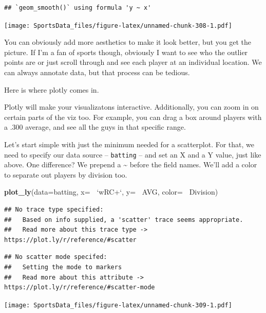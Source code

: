 \documentclass[
]{book}
\newenvironment{Shaded}{\begin{snugshade}}{\end{snugshade}}
\newcommand{\DataTypeTok}[1]{\textcolor[rgb]{0.13,0.29,0.53}{#1}}
\newcommand{\KeywordTok}[1]{\textcolor[rgb]{0.13,0.29,0.53}{\textbf{#1}}}
\newcommand{\NormalTok}[1]{#1}
\newcommand{\OperatorTok}[1]{\textcolor[rgb]{0.81,0.36,0.00}{\textbf{#1}}}
\newcommand{\StringTok}[1]{\textcolor[rgb]{0.31,0.60,0.02}{#1}}
\begin{document}
\begin{verbatim}
## `geom_smooth()` using formula 'y ~ x'
\end{verbatim}

\texttt{[image: SportsData\_files/figure-latex/unnamed-chunk-308-1.pdf]}

You can obviously add more aesthetics to make it look better, but you get the picture. If I'm a fan of sports though, obviously I want to see who the outlier points are or just scroll through and see each player at an individual location. We can always annotate data, but that process can be tedious.

Here is where plotly comes in.

Plotly will make your visualizatons interactive. Additionally, you can zoom in on certain parts of the viz too. For example, you can drag a box around players with a .300 average, and see all the guys in that specific range.

Let's start simple with just the minimum needed for a scatterplot. For that, we need to specify our data source -- \texttt{batting} -- and set an X and a Y value, just like above. One difference? We prepend a \textasciitilde{} before the field names. We'll add a color to separate out players by division too.

\begin{Shaded}
\begin{Highlighting}[]
\KeywordTok{plot_ly}\NormalTok{(}\DataTypeTok{data=}\NormalTok{batting, }\DataTypeTok{x=} \OperatorTok{~}\StringTok{`}\DataTypeTok{wRC+}\StringTok{`}\NormalTok{, }\DataTypeTok{y=} \OperatorTok{~}\NormalTok{AVG, }\DataTypeTok{color=} \OperatorTok{~}\NormalTok{Division)}
\end{Highlighting}
\end{Shaded}

\begin{verbatim}
## No trace type specified:
##   Based on info supplied, a 'scatter' trace seems appropriate.
##   Read more about this trace type -> https://plot.ly/r/reference/#scatter
\end{verbatim}

\begin{verbatim}
## No scatter mode specifed:
##   Setting the mode to markers
##   Read more about this attribute -> https://plot.ly/r/reference/#scatter-mode
\end{verbatim}

\texttt{[image: SportsData\_files/figure-latex/unnamed-chunk-309-1.pdf]}
\end{document}
